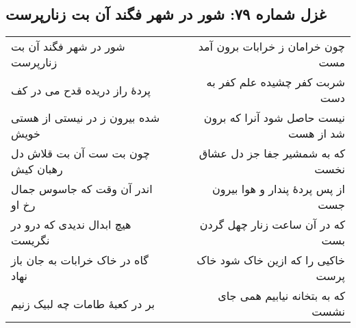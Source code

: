\begin{center}
\section*{غزل شماره ۷۹: شور در شهر فگند آن بت زنارپرست}
\label{sec:079}
\begin{longtable}{l p{0.5cm} r}
شور در شهر فگند آن بت زنارپرست
&&
چون خرامان ز خرابات برون آمد مست
\\
پردهٔ راز دریده قدح می در کف
&&
شربت کفر چشیده علم کفر به دست
\\
شده بیرون ز در نیستی از هستی خویش
&&
نیست حاصل شود آنرا که برون شد از هست
\\
چون بت ست آن بت قلاش دل رهبان کیش
&&
که به شمشیر جفا جز دل عشاق نخست
\\
اندر آن وقت که جاسوس جمال رخ او
&&
از پس پردهٔ پندار و هوا بیرون جست
\\
هیچ ابدال ندیدی که درو در نگریست
&&
که در آن ساعت زنار چهل گردن بست
\\
گاه در خاک خرابات به جان باز نهاد
&&
خاکیی را که ازین خاک شود خاک پرست
\\
بر در کعبهٔ طامات چه لبیک زنیم
&&
که به بتخانه نیابیم همی جای نشست
\\
\end{longtable}
\end{center}
